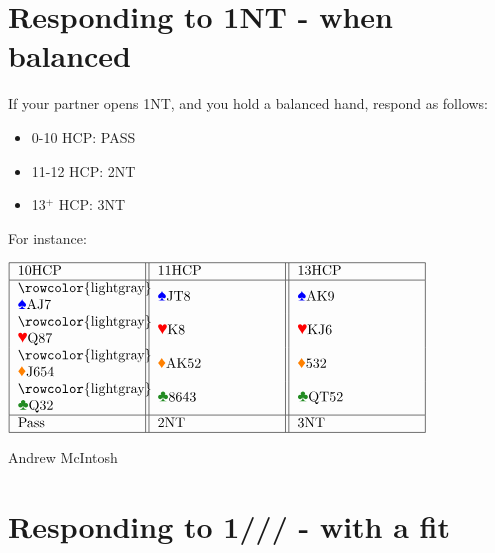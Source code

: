 \documentclass[14pt]{extarticle}
\begin{document}
\addtocounter{page}{6}

\begingroup
\centering
\section*{Responding to 1NT - when balanced} 
\endgroup
\noindent If your partner opens 1NT, and you hold a balanced hand, respond as follows:
\vspace{0.07in}
\begin{itemize}
\item 0-10 HCP: PASS
\item 11-12 HCP: 2NT
\item 13$^{+}$ HCP: 3NT
\end{itemize}
\noindent For instance:

\begin{center}
 
$\begin{tabular}{|m{3cm}||m{3cm}||m{3cm}|}
\hline
10HCP&11HCP&13HCP\\
\hline
\rowcolor{lightgray} \textcolor{blue}{\ding{171}}AJ7 & \textcolor{blue}{\ding{171}}JT8 & \textcolor{blue}{\ding{171}}AK9\\
\rowcolor{lightgray}
\textcolor{red}{\ding{170}}Q87 &\textcolor{red}{\ding{170}}K8&\textcolor{red}{\ding{170}}KJ6\\
\rowcolor{lightgray}
\textcolor{orange}{\ding{169}}J654 &\textcolor{orange}{\ding{169}}AK52&\textcolor{orange}{\ding{169}}532\\
\rowcolor{lightgray}
\textcolor{ForestGreen}{\ding{168}}Q32 &\textcolor{ForestGreen}{\ding{168}}8643&\textcolor{ForestGreen}{\ding{168}}QT52\\
\hline
Pass& 2NT & 3NT\\
\hline
\end{tabular}
$
\end{center}

\begin{center}
 \tiny
 \textcopyright Andrew McIntosh
\end{center}



\newpage
\addtocounter{page}{3}
\vspace*{\fill}
\begingroup
\centering
\section*{Responding to 1\textcolor{ForestGreen}{}/\textcolor{orange}{}/\textcolor{red}{}/\textcolor{blue}{} - with a fit}
\endgroup
\end{document}
